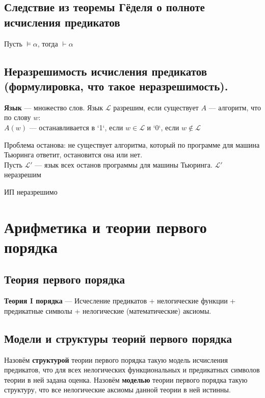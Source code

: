 \documentclass[english]{article}
\begin{document}
\subsection{Следствие из теоремы Гёделя о полноте исчисления предикатов}
\label{sec:org276456e}
\begin{corollary}
	Пусть \(\vDash \alpha\), тогда \(\vdash \alpha\)
	\label{orgece4af2}
\end{corollary}
\subsection{Неразрешимость исчисления предикатов (формулировка, что такое неразрешимость).}
\label{sec:orgd9ea79a}
\begin{definition}
	\textbf{Язык} --- множество слов. Язык \(\mathcal{L}\) разрешим, если существует \(A\) --- алгоритм, что по слову \(w\): \\
	\(A(w)\) --- останавливается в `1`, если \(w \in \mathcal{L}\) и `0`, если \(w \not\in \mathcal{L}\)
	\label{orgd24a798}
\end{definition}
\begin{remark}
	Проблема останова: не существует алгоритма, который по программе для машина Тьюринга ответит, остановится она или нет. \\
	Пусть \(\mathcal{L}'\) --- язык всех останов программы для машины Тьюринга. \(\mathcal{L}'\) неразрешим
	\label{org8241621}
\end{remark}
\begin{theorem}
	ИП неразрешимо
	\label{org41cbf0f}
\end{theorem}
\section{Арифметика и теории первого порядка}
\label{sec:orgc309b90}
\subsection{Теория первого порядка}
\label{sec:org541226c}
\begin{definition}
	\textbf{Теория I порядка} --- Исчесление предикатов + нелогические функции + предикатные символы + нелогические (математические) аксиомы.
	\label{org3c4e85c}
\end{definition}
\subsection{Модели и структуры теорий первого порядка}
\label{sec:org84f95d2}
Назовём \textbf{структурой} теории первого порядка такую модель исчисления предикатов, что для всех нелогических
функциональных и предикатных символов теории в ней задана оценка.
Назовём \textbf{моделью} теории первого порядка такую структуру, что все нелогические аксиомы данной теории в ней
истинны.
\end{document}
